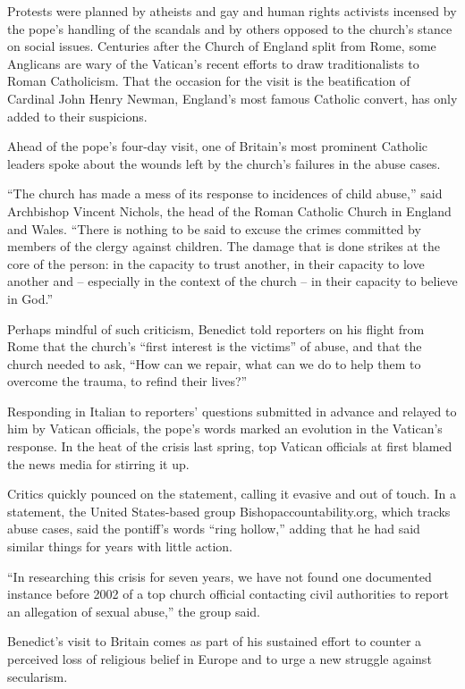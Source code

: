 ﻿\documentclass[12pt]{article}
\begin{document}
Protests were planned by atheists and gay and human rights activists incensed by the pope's handling
of the scandals and by others opposed to the church's stance on social issues. Centuries after the
Church of England split from Rome, some Anglicans are wary of the Vatican's recent efforts to draw
traditionalists to Roman Catholicism. That the occasion for the visit is the beatification of
Cardinal John Henry Newman, England's most famous Catholic convert, has only added to their
suspicions.

Ahead of the pope's four-day visit, one of Britain's most prominent Catholic leaders spoke about the
wounds left by the church's failures in the abuse cases.

``The church has made a mess of its response to incidences of child abuse,'' said Archbishop Vincent
Nichols, the head of the Roman Catholic Church in England and Wales. ``There is nothing to be said
to excuse the crimes committed by members of the clergy against children. The damage that is done
strikes at the core of the person: in the capacity to trust another, in their capacity to love
another and -- especially in the context of the church -- in their capacity to believe in God.''

Perhaps mindful of such criticism, Benedict told reporters on his flight from Rome that the church's
``first interest is the victims'' of abuse, and that the church needed to ask, ``How can we repair,
what can we do to help them to overcome the trauma, to refind their lives?''

Responding in Italian to reporters' questions submitted in advance and relayed to him by Vatican
officials, the pope's words marked an evolution in the Vatican's response. In the heat of the crisis
last spring, top Vatican officials at first blamed the news media for stirring it up.

Critics quickly pounced on the statement, calling it evasive and out of touch. In a statement, the
United States-based group Bishopaccountability.org, which tracks abuse cases, said the pontiff's
words ``ring hollow,'' adding that he had said similar things for years with little action.

``In researching this crisis for seven years, we have not found one documented instance before 2002
of a top church official contacting civil authorities to report an allegation of sexual abuse,'' the
group said.

Benedict's visit to Britain comes as part of his sustained effort to counter a perceived loss of
religious belief in Europe and to urge a new struggle against secularism.
\end{document}
